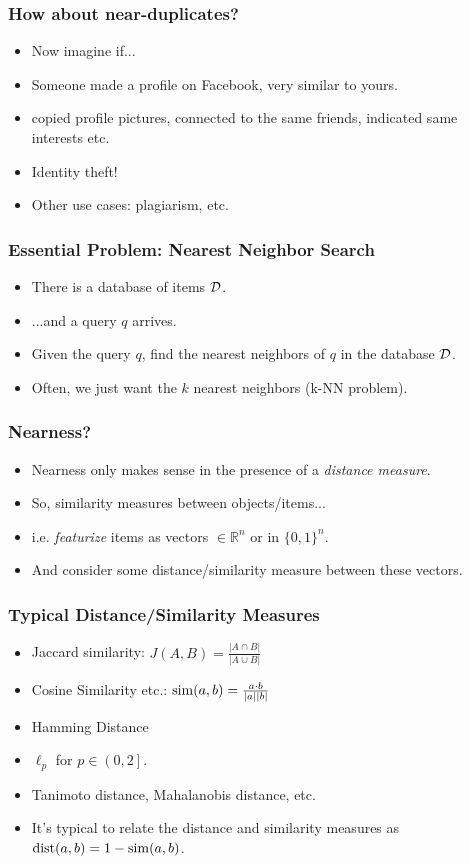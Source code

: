 \documentclass{beamer}
\begin{document}
\begin{frame}
\frametitle{How about near-duplicates?}
\begin{itemize}
\item Now imagine if...
\pause
\item Someone made a profile on Facebook, very similar to yours. 
\item copied profile pictures, \pause connected to the same friends, \pause indicated same interests \pause etc.
\pause 
\item Identity theft!
\pause
\item Other use cases: plagiarism, etc. 
\end{itemize}
\end{frame}


\begin{frame}
\frametitle{Essential Problem: Nearest Neighbor Search}
\begin{itemize}
\item There is a database of items $\cal{D}$. 
\item ...and a query $q$ arrives. 
\pause
\item Given the query $q$, find the nearest neighbors of $q$ in the database $\cal{D}$. 
\pause
\item Often, we just want the $k$ nearest neighbors (k-NN problem).
\end{itemize}
\end{frame}

\begin{frame}
\frametitle{Nearness?}
\begin{itemize}
\item Nearness only makes sense in the presence of a {\em distance measure}.
\pause 
\item So, similarity measures between objects/items...
\item i.e. {\em featurize} items \pause as vectors $\in \mathbb{R}^n$ or in $\{0, 1\}^n$. 
\pause
\item And consider some distance/similarity measure between these vectors. 
\end{itemize}
\end{frame}

\begin{frame}
\frametitle{Typical Distance/Similarity Measures}
\begin{itemize}
\item Jaccard similarity: $J(A, B) = \frac{|A \cap B|}{|A \cup B|}$
\pause
\item Cosine Similarity etc.: $\mathrm{sim}(a, b) = \frac{a \cdot b}{|a||b|}$
\pause
\item Hamming Distance
\item $\ell_p$ for $p \in \left(0, 2\right]$.
\item Tanimoto distance, Mahalanobis distance, etc. 
\pause
\item It's typical to relate the distance and similarity measures as $\mathrm{dist}(a, b) = 1 -\mathrm{sim}(a, b)$.
\end{itemize}
\end{frame}
\end{document}
